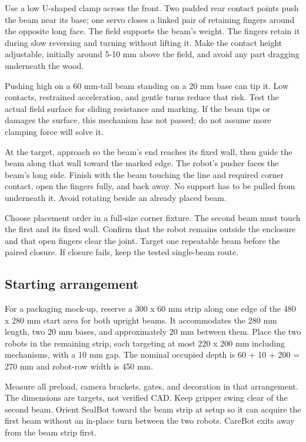 \documentclass[10pt,a4paper]{article}
\begin{document}
Use a low U-shaped clamp across the front. Two padded rear contact points push the beam near its base; one servo closes a linked pair of retaining fingers around the opposite long face. The field supports the beam's weight. The fingers retain it during slow reversing and turning without lifting it. Make the contact height adjustable, initially around 5-10 mm above the field, and avoid any part dragging underneath the wood.

Pushing high on a 60 mm-tall beam standing on a 20 mm base can tip it. Low contacts, restrained acceleration, and gentle turns reduce that risk. Test the actual field surface for sliding resistance and marking. If the beam tips or damages the surface, this mechanism has not passed; do not assume more clamping force will solve it.

At the target, approach so the beam's end reaches its fixed wall, then guide the beam along that wall toward the marked edge. The robot's pusher faces the beam's long side. Finish with the beam touching the line and required corner contact, open the fingers fully, and back away. No support has to be pulled from underneath it. Avoid rotating beside an already placed beam.

Choose placement order in a full-size corner fixture. The second beam must touch the first and its fixed wall. Confirm that the robot remains outside the enclosure and that open fingers clear the joint. Target one repeatable beam before the paired closure. If closure fails, keep the tested single-beam route.

\subsection{Starting arrangement}
For a packaging mock-up, reserve a 300 x 60 mm strip along one edge of the 480 x 280 mm start area for both upright beams. It accommodates the 280 mm length, two 20 mm bases, and approximately 20 mm between them. Place the two robots in the remaining strip, each targeting at most 220 x 200 mm including mechanisms, with a 10 mm gap. The nominal occupied depth is 60 + 10 + 200 = 270 mm and robot-row width is 450 mm.

Measure all preload, camera brackets, gates, and decoration in that arrangement. The dimensions are targets, not verified CAD. Keep gripper swing clear of the second beam. Orient SealBot toward the beam strip at setup so it can acquire the first beam without an in-place turn between the two robots. CareBot exits away from the beam strip first.
\end{document}
